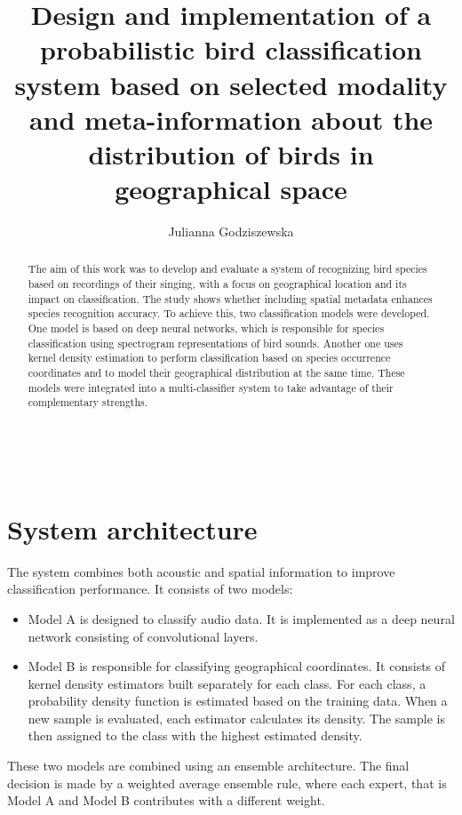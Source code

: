 \documentclass[runningheads]{llncs}
\begin{document}
%
\title{Design and implementation of a probabilistic bird classification system based on selected modality and meta-information about the distribution of birds in geographical space}
%
%
\author{Julianna Godziszewska}
%
%
\\

%
\maketitle              %
%

\begin{abstract}

The aim of this work was to develop and evaluate a system of recognizing bird species based on recordings of their singing, with a focus on geographical location and its impact on classification. The study shows whether including spatial metadata enhances species recognition accuracy. To achieve this, two classification models were developed. One model is based on deep neural networks, which is responsible for species classification using spectrogram representations of bird sounds. Another one uses kernel density estimation to perform classification based on species occurrence coordinates and to model their geographical distribution at the same time. These models were integrated into a multi-classifier system to take advantage of their complementary strengths.\\
\end{abstract}

\section*{System architecture}

The system combines both acoustic and spatial information to improve classification performance. It consists of two models:
\begin{itemize}
    \item Model A is designed to classify audio data. It is implemented as a deep neural network consisting of convolutional layers.
    \item Model B is responsible for classifying geographical coordinates. It consists of kernel density estimators built separately for each class. For each class, a probability density function is estimated based on the training data. When a new sample is evaluated, each estimator calculates its density. The sample is then assigned to the class with the highest estimated density.
\end{itemize}
These two models are combined using an ensemble architecture. The final decision is made by a weighted average ensemble rule, where each expert, that is Model A and Model B contributes with a different weight.
\end{document}

